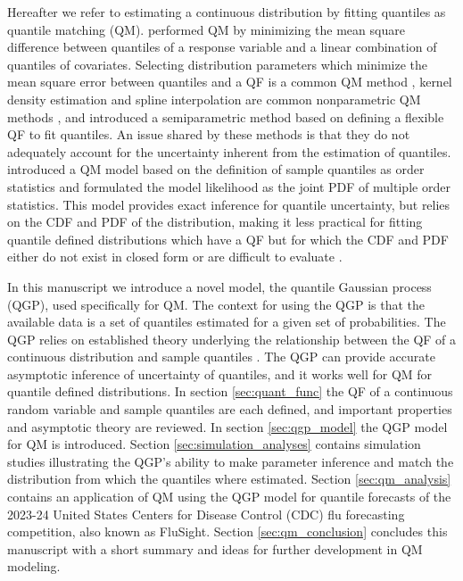 \documentclass[preprint,12pt,authoryear]{elsarticle}
\begin{document}
Hereafter we refer to estimating a continuous distribution by fitting quantiles as quantile matching (QM).
\cite{sgouropoulos2015matching} performed QM by minimizing the mean square difference between quantiles of a response variable and a linear combination of quantiles of covariates. Selecting distribution parameters which minimize the mean square error
between quantiles and a QF is a common QM method \cite[]{dilger2022distributions,li2019combining, belgorodski2017quantilemse}, 
kernel density estimation and spline interpolation are common nonparametric QM methods \cite[]{gerding2023evaluating,gyamerah2020probabilistic,he2016short}, and \cite{keelin2016metalog} introduced a semiparametric method based on defining a flexible QF to fit quantiles. An issue shared by these methods is that they do not adequately account for the uncertainty inherent from the estimation of quantiles.  \cite{nirwan2020bayesian} introduced a QM model based on the definition of sample quantiles as order statistics and formulated
the model likelihood as the joint PDF of multiple order statistics. This model provides exact inference for quantile uncertainty, but relies on the CDF and PDF of the distribution, making it less practical for fitting quantile defined distributions which have a QF but for which the CDF and PDF either do not exist in closed form or are difficult to evaluate \cite[]{perepolkin2023tenets,joiner1971some,tukey1960practical}. 
 


In this manuscript we introduce a novel model, the quantile Gaussian process (QGP), used specifically for QM. The context for using the QGP is that the available data is a set of quantiles estimated for a given set of probabilities.
The QGP relies on established theory underlying the relationship between the QF of a continuous distribution and sample quantiles \cite[]{parzen2004quantile, gilchrist2000statistical,hyndman1996sample,walker1968note,cramer1951mathematical}. The QGP can provide accurate asymptotic inference of uncertainty of quantiles, and it works well for QM for quantile defined distributions. 
In section \ref{sec:quant_func} the QF of a continuous random variable and sample quantiles are each defined, and important properties and asymptotic theory are reviewed. In section \ref{sec:qgp_model} the QGP model for QM is introduced. Section \ref{sec:simulation_analyses} contains simulation studies illustrating the QGP's ability to make parameter inference and match the distribution from which the quantiles where estimated. Section \ref{sec:qm_analysis} contains an application of QM using the QGP model for quantile forecasts of the 2023-24 United States Centers for Disease Control (CDC) flu forecasting competition, also known as FluSight. Section \ref{sec:qm_conclusion} concludes this manuscript with a short summary and ideas for further development in QM modeling.
\end{document}
